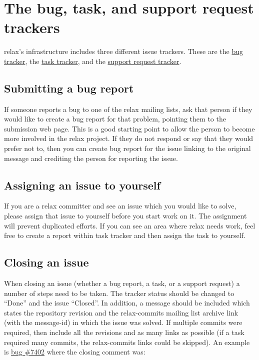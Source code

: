 \section{The bug, task, and support request trackers}

relax's infrastructure includes three different issue trackers.
These are the \href{https://gna.org/bugs/?group=relax}{bug tracker}, the \href{https://gna.org/task/?group=relax}{task tracker}, and the \href{https://gna.org/support/?group=relax}{support request tracker}.



\subsection{Submitting a bug report}

If someone reports a bug to one of the relax mailing lists, ask that person if they would like to create a bug report for that problem, pointing them to the submission web page.
This is a good starting point to allow the person to become more involved in the relax project.
If they do not respond or say that they would prefer not to, then you can create bug report for the issue linking to the original message and crediting the person for reporting the issue.



\subsection{Assigning an issue to yourself}

If you are a relax committer and see an issue which you would like to solve, please assign that issue to yourself before you start work on it.
The assignment will prevent duplicated efforts.
If you can see an area where relax needs work, feel free to create a report within task tracker and then assign the task to yourself.



\subsection{Closing an issue}

When closing an issue (whether a bug report, a task, or a support request) a number of steps need to be taken.
The tracker status should be changed to ``Done'' and the issue ``Closed''.
In addition, a message should be included which states the repository revision and the relax-commits mailing list archive link (with the message-id) in which the issue was solved.
If multiple commits were required, then include all the revisions and as many links as possible (if a task required many commits, the relax-commits links could be skipped).
An example is \href{https://gna.org/bugs/?7402}{bug \#7402} where the closing comment was:

